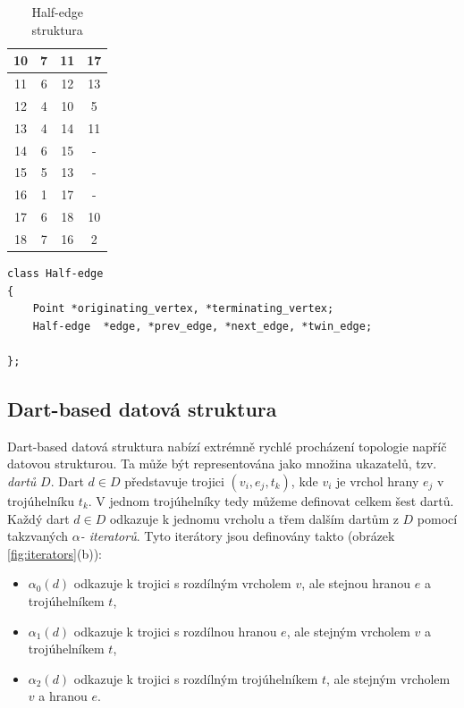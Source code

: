 \documentclass[12pt,a4paper]{article}
\begin{document}
\begin{table}[h!]
\begin{tabular}{|c||c||c|c|}
10                         & 7                                 & 11                         & 17        \\ \hline
11                         & 6                                 & 12                         & 13        \\ \hline
12                         & 4                                 & 10                         & 5         \\ \hline
13                         & 4                                 & 14                         & 11        \\ \hline
14                         & 6                                 & 15                         & -         \\ \hline
15                         & 5                                 & 13                         & -         \\ \hline
16                         & 1                                 & 17                         & -         \\ \hline
17                         & 6                                 & 18                         & 10        \\ \hline
18                         & 7                                 & 16                         & 2         \\ \hline
\end{tabular}
\caption{Half-edge struktura}
\label{tab:half_edge}
\end{table}

\newpage
\begin{lstlisting}[caption={Definice datové struktury}]
class Half-edge
{
	Point *originating_vertex, *terminating_vertex;
	Half-edge  *edge, *prev_edge, *next_edge, *twin_edge;
	
};
\end{lstlisting}

\subsection{Dart-based datová struktura}

Dart-based datová struktura nabízí extrémně rychlé procházení
topologie napříč datovou strukturou. Ta může být representována jako
množina ukazatelů, tzv. \emph{dartů} $D$. Dart $d \in D$ představuje
trojici $(v_i, e_j, t_k)$, kde $v_i$ je vrchol hrany $e_j$ v
trojúhelníku $t_k$. V jednom trojúhelníky tedy můžeme definovat celkem
šest dartů. Každý dart $d \in D$ odkazuje k jednomu vrcholu a třem
dalším dartům z $D$ pomocí takzvaných $\alpha$\emph{- iteratorů}. Tyto
iterátory jsou definovány takto (obrázek \ref{fig:iterators}(b)):
\begin{itemize}
\item $\alpha_0(d)$ odkazuje k trojici s rozdílným vrcholem $v$, ale stejnou hranou $e$ a trojúhelníkem $t$,
\item $\alpha_1(d)$ odkazuje k trojici s rozdílnou hranou $e$, ale stejným vrcholem $v$ a trojúhelníkem $t$,
\item $\alpha_2(d)$ odkazuje k trojici s rozdílným trojúhelníkem $t$, ale stejným vrcholem $v$ a hranou $e$.
\end{itemize}
\end{document}
